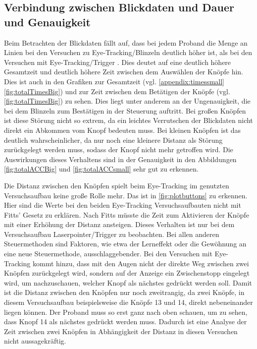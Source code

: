\subsection{Verbindung zwischen Blickdaten und Dauer und Genauigkeit}
\label{section:heatmapsAnalysis}
Beim Betrachten der Blickdaten fällt auf, dass bei jedem Proband die Menge an Linien bei den Versuchen zu Eye-Tracking/Blinzeln deutlich höher ist, als bei den Versuchen mit Eye-Tracking/Trigger . Dies deutet auf eine deutlich höhere Gesamtzeit und deutlich höhere Zeit zwischen dem Auswählen der Knöpfe hin. Dies ist auch in den Grafiken zur Gesamtzeit (vgl. \autoref{appendix:timessmall} \autoref{fig:totalTimesBig}) und zur Zeit zwischen dem Betätigen der Knöpfe (vgl. \autoref{fig:totalTimesBig}) zu sehen. Dies liegt unter anderem an der Ungenauigkeit, die bei dem Blinzeln zum Bestätigen in der Steuerung auftritt. Bei großen Knöpfen ist diese Störung nicht so extrem, da ein leichtes Verrutschen der Blickdaten nicht direkt ein Abkommen vom Knopf bedeuten muss. Bei kleinen Knöpfen ist das deutlich wahrscheinlicher, da nur noch eine kleinere Distanz als Störung zurückgelegt werden muss, sodass der Knopf nicht mehr getroffen wird. Die Auswirkungen dieses Verhaltens sind in der Genauigkeit in den Abbildungen \ref{fig:totalACCBig} und \ref{fig:totalACCsmall} sehr gut zu erkennen. 

Die Distanz zwischen den Knöpfen spielt beim Eye-Tracking im genutzten Versuchsaufbau keine große Rolle mehr. Das ist in \autoref{fig:plotbuttons} zu erkennen. Hier sind die Werte bei den beiden Eye-Tracking Versuchsaufbauten nicht mit Fitts' Gesetz zu erklären. Nach Fitts müsste die Zeit zum Aktivieren der Knöpfe mit einer Erhöhung der Distanz ansteigen. Dieses Verhalten ist nur bei dem Versuchsaufbau Laserpointer/Trigger zu beobachten. Bei allen anderen Steuermethoden sind Faktoren, wie etwa der Lerneffekt oder die Gewöhnung an eine neue Steuermethode, ausschlaggebender. Bei den Versuchen mit Eye-Tracking kommt hinzu, dass mit den Augen nicht der direkte Weg zwischen zwei Knöpfen zurückgelegt wird, sondern auf der Anzeige ein Zwischenstopp eingelegt wird, um nachzuschauen, welcher Knopf als nächstes gedrückt werden soll. Damit ist die Distanz zwischen den Knöpfen nur noch zweitrangig, da zwei Knöpfe, in diesem Versuchsaufbau beispielsweise die Knöpfe 13 und 14, direkt nebeneinander liegen können. Der Proband muss so erst ganz nach oben schauen, um zu sehen, dass Knopf 14 als nächstes gedrückt werden muss. Dadurch ist eine Analyse der Zeit zwischen zwei Knöpfen in Abhängigkeit der Distanz in diesen Versuchen nicht aussagekräftig.

